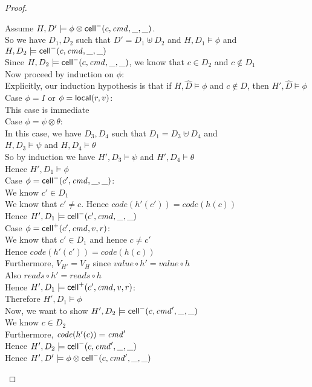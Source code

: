 \begin{proof}
  \begin{tabbedproof}
    \oo Assume $H, D' \models \phi \otimes \mathsf{cell}^{-}({c}, {\mathit{cmd}}, {\_}, {\_})$. \\
    \ooo So we have $D_1, D_2$ such that $D' = D_1 \uplus D_2$ and $H, D_1 \models \phi$ and $H, D_2 \models \mathsf{cell}^{-}({c}, {\mathit{cmd}}, {\_}, {\_})$ \\
    \ooo Since $H, D_2 \models \mathsf{cell}^{-}({c}, {\mathit{cmd}}, {\_}, {\_})$, we know that $c \in D_2$ and $c \not\in D_1$ \\
    \ooo Now proceed by induction on $\phi$: \\
    \ooo Explicitly, our induction hypothesis is that if $H, \hat{D} \models \phi$ and $c \not \in D$, then $H', \hat{D} \models \phi$ \\
    \ooo Case $\phi = I$ or $\phi = \mathsf{local}({r}, {v})$: \\
    \oooo This case is immediate \\
    \ooo Case $\phi = \psi \otimes \theta$: \\
    \oooo In this case, we have $D_3, D_4$ such that $D_1 = D_3 \uplus D_4$ and  \\
    \oooox $H, D_3 \models \psi$ and $H, D_4 \models \theta$ \\
    \oooo So by induction we have $H', D_3 \models \psi$ and $H', D_4 \models \theta$ \\
    \oooo Hence $H', D_1 \models \phi$\\
    \ooo Case $\phi = \mathsf{cell}^{-}({c'}, {\mathit{cmd}}, {\_}, {\_})$: \\
    \oooo We know $c' \in D_1$ \\
    \oooo We know that $c' \not= c$. Hence $\mathit{code}(h'(c')) = \mathit{code}(h(c))$ \\
    \oooo Hence $H', D_1 \models \mathsf{cell}^{-}({c'}, {\mathit{cmd}}, {\_}, {\_})$ \\
    \ooo Case $\phi = \mathsf{cell}^{+}({c'}, {\mathit{cmd}}, {v}, {r})$: \\
    \oooo We know that $c' \in D_1$ and hence $c \not= c'$ \\
    \oooo Hence $\mathit{code}(h'(c')) = \mathit{code}(h(c))$ \\
    \oooo Furthermore, $V_{H'} = V_H$ since $\mathit{value} \circ h' = \mathit{value} \circ h$\\
    \oooo Also $\mathit{reads} \circ h' = \mathit{reads} \circ h$ \\
    \oooo Hence $H', D_1 \models \mathsf{cell}^{+}({c'}, {\mathit{cmd}}, {v}, {r})$: \\
    \ooo Therefore $H', D_1 \models \phi$ \\
    \ooo Now, we want to show $H', D_2 \models \mathsf{cell}^{-}({c}, {\mathit{cmd}'}, {\_}, {\_})$ \\
    \oooo We know $c \in D_2$ \\
    \oooo Furthermore, $\mathit{code}(h'(c)) = \mathit{cmd}'$ \\
    \oooo Hence $H', D_2 \models \mathsf{cell}^{-}({c}, {\mathit{cmd}'}, {\_}, {\_})$ \\
    \ooo Hence $H', D' \models \phi \otimes \mathsf{cell}^{-}({c}, {\mathit{cmd}'}, {\_}, {\_})$ 
  \end{tabbedproof}
\end{proof}

